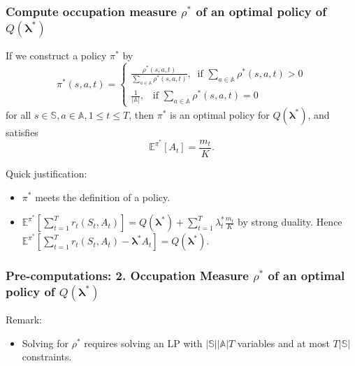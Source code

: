 \documentclass{beamer}
\newcommand{\lambdav}{\pmb{\lambda}}
\newcommand{\subp}{\pi}
\newcommand{\substates}{\mathbb{S}}
\newcommand{\subactions}{\mathbb{A}}
\newcommand{\subaction}{a}
\begin{document}
\begin{frame}[plain]
\frametitle{Compute occupation measure $\rho^*$ of an optimal policy of $Q(\lambdav^*)$}
\begin{Lemma}\label{th:exist}
If we construct a policy $\pi^*$ by
\begin{equation}\label{df:rho}
\subp^{*}(s,a,t)=
\begin{cases}
\frac{\rho^*(s,a,t)}{\sum_{a\in\subactions}\rho^*(s,a,t)},\; \; \text{if }\sum_{a\in\subactions}\rho^*(s,a,t)>0\\
\frac{1}{|\subactions|}, \;\;\;\text{if }\sum_{a\in\subactions}\rho^*(s,a,t)=0 
\end{cases}
\end{equation}for all $s\in \substates,\subaction\in\subactions,1\leq t\leq T$, then $\pi^*$ is an optimal policy for $Q(\lambdav^*)$, and satisfies
\begin{equation}
\mathbb{E}^{\pi^*}[A_t]=\frac{m_t}{K}.
\end{equation} 
\end{Lemma}
Quick justification: 
\begin{itemize}
\item $\pi^*$ meets the definition of a policy.
\item $\mathbb{E}^{\pi^*}[\sum_{t=1}^Tr_t(S_t,A_t)] = Q(\lambdav^*)+\sum_{t=1}^{T}\lambda_t^*\frac{m_t}{K}$ by strong duality. Hence $\mathbb{E}^{\pi^*}[\sum_{t=1}^Tr_t(S_t,A_t)-\lambdav^*A_t] = Q(\lambdav^*)$.
\end{itemize}

\end{frame}

\begin{frame}[plain]
\frametitle{Pre-computations: 2. Occupation Measure $\rho^*$ of an optimal policy of $Q(\lambdav^*)$}
Remark: 
\begin{itemize}
\item Solving for $\rho^*$ requires solving an LP with $|\substates||\subactions|T$ variables and at most $T|\substates|$ constraints.
\end{itemize}
\end{frame}

\end{document}
